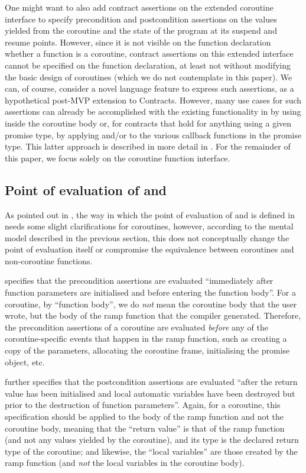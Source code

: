 One might want to also add contract assertions on the extended coroutine interface to specify precondition and postcondition assertions on the values yielded from the coroutine and the state of the program at its suspend and resume points. However, since it is not visible on the function declaration whether a function is a coroutine, contract assertions on this extended interface cannot be specified on the function declaration, at least not without modifying the basic design of coroutines (which we do not contemplate in this paper). We can, of course, consider a novel language feature to express such assertions, as a hypothetical post-MVP extension to Contracts. However, many use cases for such assertions can already be accomplished with the existing functionality in \cite{P2900R8} by using  inside the coroutine body or, for contracts that hold for anything using a given promise type, by applying  and/or  to the various callback functions in the promise type. This latter approach is described in more detail in \cite{P3251R0}. For the remainder of this paper, we focus solely on the coroutine function interface.

\subsection{Point of evaluation of  and }

As pointed out in \cite{P2957R1}, the way in which the point of evaluation of  and  is defined in \cite{P2900R8} needs some slight clarifications for coroutines, however, according to the mental model described in the previous section, this does not conceptually change the point of evaluation itself or compromise the equivalence between coroutines and non-coroutine functions.

\cite{P2900R8} specifies that the precondition assertions are evaluated ``immediately after function parameters are initialised and before entering the function body''. For a coroutine, by ``function body'', we do \emph{not} mean the coroutine body that the user wrote, but the body of the ramp function that the compiler generated. Therefore, the precondition assertions of a coroutine are evaluated \emph{before} any of the coroutine-specific events that happen in the ramp function, such as creating a copy of the parameters, allocating the coroutine frame, initialising the promise object, etc.

\cite{P2900R8} further specifies that the postcondition assertions are evaluated ``after the return value has been initialised and local automatic variables have been destroyed but prior to the destruction of function parameters''. Again, for a coroutine, this specification should be applied to the body of the ramp function and not the coroutine body, meaning that the ``return value'' is that of the ramp function (and not any values yielded by the coroutine), and its type is the declared return type of the coroutine; and likewise, the ``local variables'' are those created by the ramp function (and \emph{not} the local variables in the coroutine body).

